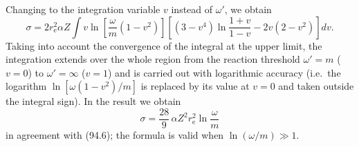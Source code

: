 \begin{enumerate}
Changing to the integration variable $v$ instead of $\omega'$, we obtain
\[
\sigma = 2r_\mathrm{e}^2\alpha Z\int v\ln\!\left[\frac{\omega}{m}(1-v^2)\right]\!\left[(3-v^4)\ln\frac{1+v}{1-v} - 2v(2-v^2)\right]dv.
\]
Taking into account the convergence of the integral at the upper limit, the integration extends over the whole region from the reaction threshold $\omega' = m$ ($v = 0$) to $\omega' = \infty$ ($v = 1$) and is carried out with logarithmic accuracy (i.e.\ the logarithm $\ln[\omega(1-v^2)/m]$ is replaced by its value at $v = 0$ and taken outside the integral sign). In the result we obtain
\[
\sigma = \frac{28}{9}\,\alpha Z^2 r_\mathrm{e}^2\ln\frac{\omega}{m}
\]
in agreement with (94.6); the formula is valid when $\ln(\omega/m) \gg 1$.

\end{enumerate}

